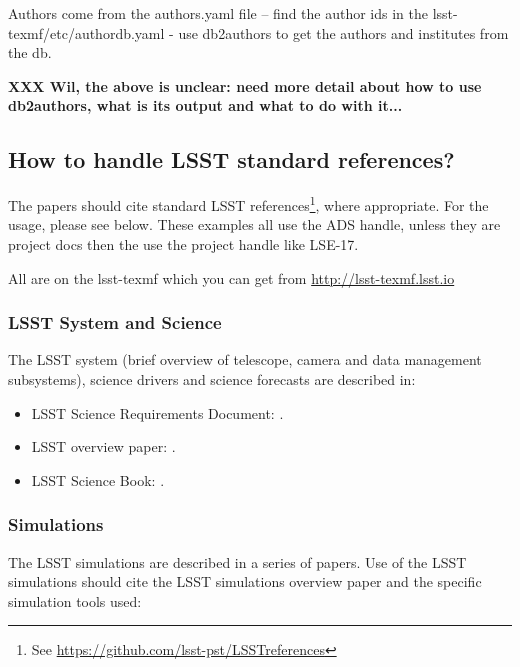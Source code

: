 Authors come from the authors.yaml file --  find the author ids in the lsst-texmf/etc/authordb.yaml - use db2authors to get the authors and institutes from the db. 

{\bf XXX Wil, the above is unclear: need more detail about how to use db2authors,
what is its output and what to do with it...} 


\subsection{How to handle LSST standard references?} 

The papers should cite standard LSST references\footnote{See \url{https://github.com/lsst-pst/LSSTreferences}}, 
where appropriate. For the usage, please see below.  These examples all use the ADS handle, unless they are 
project docs then the use the project handle like LSE-17.

All are on the lsst-texmf which you can get from \url{http://lsst-texmf.lsst.io}


\subsubsection{LSST System and Science}

The LSST system (brief overview of telescope, camera and data management subsystems),
science drivers and science forecasts are described in:

\begin{itemize}
\item LSST Science Requirements Document: \cite{LPM-17}.
\item LSST overview paper: \cite{2008arXiv0805.2366I}.
\item LSST Science Book: \cite{abell2009lsst}.
\end{itemize}


\subsubsection{Simulations}

The LSST simulations are described in a series of papers. Use of the LSST simulations should cite the LSST simulations overview paper \cite{2014SPIE.9150E..14C} and the specific simulation tools used:

